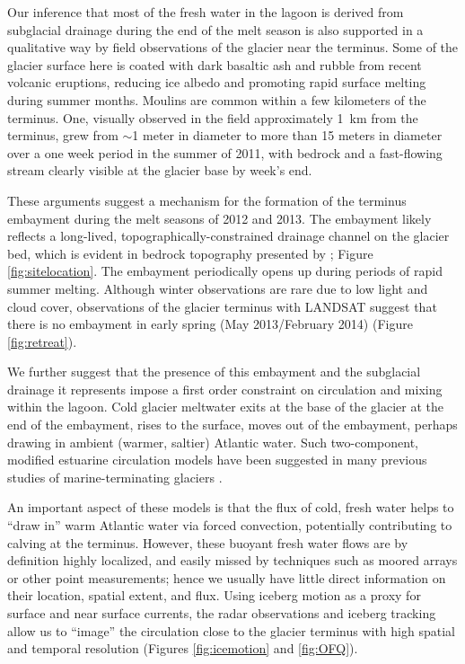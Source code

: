 Our inference that most of the fresh water in the lagoon is derived from subglacial drainage during the end of the melt season is also supported in a qualitative way by field observations of the glacier near the terminus.  Some of the glacier surface here is coated with dark basaltic ash and rubble from recent volcanic eruptions, reducing ice albedo and promoting rapid surface melting during summer months.  Moulins are common within a few kilometers of the terminus. One, visually observed in the field approximately 1~km from the terminus, grew from $\sim$1 meter in diameter to more than 15 meters in diameter over a one week period in the summer of 2011, with bedrock and a fast-flowing stream clearly visible at the glacier base by week’s end.

 These arguments suggest a mechanism for the formation of the terminus embayment during the melt seasons of 2012 and 2013.  The embayment likely reflects a long-lived, topographically-constrained drainage channel on the glacier bed, which is evident in bedrock topography presented by \citet{bjornsson2001jokulsarlon}; Figure \ref{fig:sitelocation}. The embayment periodically opens up during periods of rapid summer melting. 
 Although winter observations are rare due to low light and cloud cover, observations of the glacier terminus with LANDSAT suggest that there is no embayment in early spring (May 2013/February 2014) (Figure \ref{fig:retreat}).

We further suggest that the presence of this embayment and the subglacial drainage it represents impose a first order constraint on circulation and mixing within the lagoon. Cold glacier meltwater exits at the base of the glacier at the end of the embayment, rises to the surface, moves out of the embayment, perhaps drawing in ambient (warmer, saltier) Atlantic water.  Such two-component, modified estuarine circulation models have been suggested in many previous studies of marine-terminating glaciers \citep{motyka2003submarine,motyka2011submarine,holland2008acceleration,rignot2010rapid,straneo2010rapid,straneo2012characteristics,mortensen2011heat}. 

 An important aspect of these models is that the flux of cold, fresh water helps to “draw in” warm Atlantic water via forced convection, potentially contributing to calving at the terminus.  However, these buoyant fresh water flows are by definition highly localized, and easily missed by techniques such as moored arrays or other point measurements; hence we usually have little direct information on their location, spatial extent, and flux.  Using iceberg motion as a proxy for surface and near surface currents, the radar observations and iceberg tracking allow us to “image” the circulation close to the glacier terminus with high spatial and temporal resolution (Figures \ref{fig:icemotion} and \ref{fig:OFQ}). 

